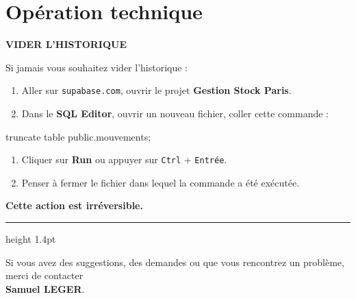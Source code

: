 \documentclass[11pt,a4paper]{article}
\newcommand{\eyebrow}[1]{{\sffamily\fontfamily{qag}\selectfont\bfseries\small\color{accentdark}\MakeUppercase{#1}}\par\vspace{2pt}}
\begin{document}
\section{Opération technique}
\eyebrow{Vider l'historique}
\begin{technicalbox}
Si jamais vous souhaitez vider l'historique :
\begin{enumerate}
  \item Aller sur \texttt{supabase.com}, ouvrir le projet \textbf{Gestion Stock Paris}.
  \item Dans le \textbf{SQL Editor}, ouvrir un nouveau fichier, coller cette commande :
\end{enumerate}

\begin{sqlbox}
truncate table public.mouvements;
\end{sqlbox}

\begin{enumerate}[start=3]
  \item Cliquer sur \textbf{Run} ou appuyer sur \texttt{Ctrl} + \texttt{Entrée}.
  \item Penser à fermer le fichier dans lequel la commande a été exécutée.
\end{enumerate}

\vspace{4pt}
{\small\bfseries\color{warn}Cette action est irréversible.}
\end{technicalbox}

\vspace{18pt}
{\color{border}\hrule height 1.4pt}
\vspace{10pt}
\noindent\small Si vous avez des suggestions, des demandes ou que vous rencontrez un
problème, merci de contacter\\
{\sffamily{}\selectfont\bfseries Samuel LEGER}.
\end{document}
